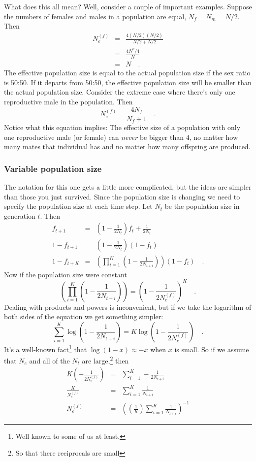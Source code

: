 \documentclass[12pt]{article}
\begin{document}
What does this all mean? Well, consider a couple of important
examples. Suppose the numbers of females and males in a population are
equal, $N_f = N_m = N/2$. Then
\begin{eqnarray*}
N_e^{(f)} &=& \frac{4(N/2)(N/2)}{N/2 + N/2} \\
          &=& \frac{4N^2/4}{N} \\
          &=& N \quad .
\end{eqnarray*}
The effective population size is equal to the actual population size
if the sex ratio is 50:50. If it departs from 50:50, the effective
population size will be smaller than the actual population
size. Consider the extreme case where there's only one reproductive
male in the population. Then
\begin{equation}
N_e^{(f)} = \frac{4N_f}{N_f + 1} \quad . \label{eq:ne-harem}
\end{equation}
Notice what this equation implies: The effective size of a population
with only one reproductive male (or female) can {\it never\/} be
bigger than 4, no matter how many mates that individual has and no
matter how many offspring are produced.

\subsubsection*{Variable population size}

The notation for this one gets a little more complicated, but the
ideas are simpler than those you just survived. Since the population
size is changing we need to specify the population size at each time
step. Let $N_t$ be the population size in generation $t$. Then
\begin{eqnarray*}
f_{t+1} &=& \left(1-\frac{1}{2N_t}\right)f_t + \frac{1}{2N_t} \\
1 - f_{t+1} &=& \left(1-\frac{1}{2N_t}\right)(1-f_t) \\
1 - f_{t+K} &=&
\left(\prod_{i=1}^K\left(1-\frac{1}{2N_{t+i}}\right)\right)(1-f_t) \quad .
\end{eqnarray*}
Now if the population size were constant
\[
\left(\prod_{i=1}^K\left(1-\frac{1}{2N_{t+i}}\right)\right) =
\left(1 - \frac{1}{2N_e^{(f)}}\right)^K \quad .
\]
Dealing with products and powers is inconvenient, but if we take the
logarithm of both sides of the equation we get something simpler:
\[
\sum_{i=1}^K\log\left(1-\frac{1}{2N_{t+i}}\right) =
K\log\left(1 - \frac{1}{2N_e^{(f)}}\right) \quad .
\]
It's a well-known fact\footnote{Well known to some of us at least.}
that $\log(1-x) \approx -x$ when $x$ is small. So if we assume that
$N_e$ and all of the $N_{t}$ are large,\footnote{So that there
  reciprocals are small} then
\begin{eqnarray*}
K\left(-\frac{1}{2N_e^{(f)}}\right)
  &=& \sum_{i=1}^K-\frac{1}{2N_{t+i}} \\
\frac{K}{N_e^{(f)}} &=& \sum_{i=1}^K\frac{1}{N_{t+i}} \\
N_e^{(f)} &=& \left(\left(\frac{1}{K}\right)
                    \sum_{i=1}^K\frac{1}{N_{t+i}}\right)^{-1}
\end{eqnarray*}
\end{document}
